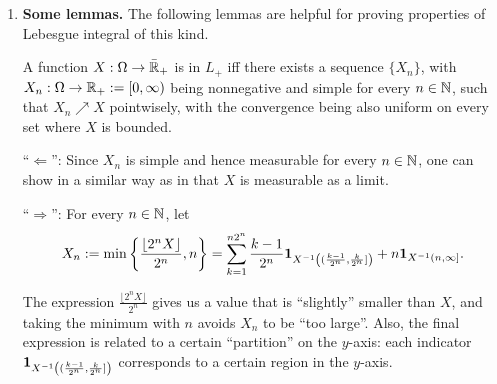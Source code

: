 \begin{enumerate}
\item \textbf{Some lemmas.} The following lemmas are helpful for proving
properties of Lebesgue integral of this kind.
\begin{lemma}
\label{lma:apx-seq}
A function \(X:\Omega\to\bar{\mathbb{R}}_{+}\) is in \(L_{+}\) iff there exists a
sequence \(\{X_n\}\), with \(X_n:\Omega\to\mathbb{R}_{+}:=[0,\infty)\) being
nonnegative and simple for every \(n\in\mathbb{N}\), such that
\(X_n\nearrow X\) pointwisely, with the convergence being also uniform on
every set where \(X\) is bounded.
\end{lemma}
\begin{pf}
``\(\Leftarrow\)'': Since \(X_n\) is simple and hence measurable for every
\(n\in\mathbb{N}\), one can show in a similar way as in 
that \(X\) is measurable as a limit.

``\(\Rightarrow\)'': For every \(n\in\mathbb{N}\), let
\[
X_n:=\min\left\{\frac{\lfloor 2^nX\rfloor}{2^n},n\right\}
=\sum_{k=1}^{n2^{n}}\frac{k-1}{2^{n}}\mathbf{1}_{X^{-1}\left((\frac{k-1}{2^{n}},\frac{k}{2^{n}}]\right)}
+n\mathbf{1}_{X^{-1}(n,\infty]}.
\]
\begin{intuition}
The expression \(\frac{\lfloor 2^nX\rfloor}{2^n}\) gives us a value that is
``slightly'' smaller than \(X\), and taking the minimum with \(n\) avoids
\(X_n\) to be ``too large''. Also, the final expression is related to a
certain ``partition'' on the \(y\)-axis: each indicator
\(\mathbf{1}_{X^{-1}\left((\frac{k-1}{2^{n}},\frac{k}{2^{n}}]\right)}\) corresponds
to a certain region in the \(y\)-axis.
\end{intuition}


\end{pf}
\end{enumerate}
